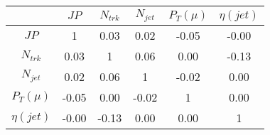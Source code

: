 \begin{tabular}{|c|c|c|c|c|c|} 
\hline
 & $JP$ & $N_{trk}$ & $N_{jet}$ & $P_{T} (\mu)$ & $\eta (jet)$ \\ \hline
$JP$ & 1 & 0.03 & 0.02 & -0.05 & -0.00 \\
$N_{trk}$ & 0.03 & 1 & 0.06 & 0.00 & -0.13 \\
$N_{jet}$ & 0.02 & 0.06 & 1 & -0.02 & 0.00 \\
$P_{T} (\mu)$ & -0.05 & 0.00 & -0.02 & 1 & 0.00 \\
$\eta (jet)$ & -0.00 & -0.13 & 0.00 & 0.00 & 1 \\
\hline 
\end{tabular} 


